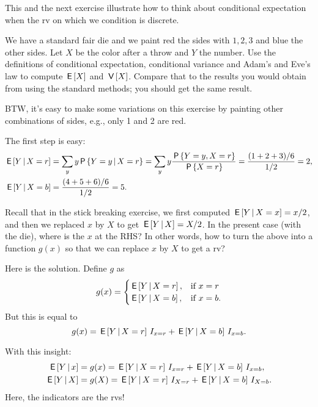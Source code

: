 This and the next exercise illustrate how to think about conditional expectation when the rv on which we condition is discrete.

\begin{exercise}
We have a standard fair die and we paint red the sides with $1, 2, 3$ and blue the other sides.
Let $X$ be the color after a throw and $Y$ the number.
Use the definitions of conditional expectation, conditional variance and Adam's and Eve's law to compute $\,\mathsf{E}\left[X\right]$ and $\,\mathsf{V}\left[X\right]$.
Compare that to the results you would obtain from using the standard methods; you should get the same result.

BTW, it's easy to make some variations on this exercise by painting other combinations of sides, e.g., only 1 and 2 are red.
\begin{solution}
The first step is easy:
\begin{align}
\,\mathsf{E}\left[Y\,\middle|\, X=r\right] &= \sum_{y} y \,\mathsf{P}\left\{Y=y\,\middle|\, X=r\right\} = \sum_{y} y \frac{\,\mathsf{P}\left\{Y=y,  X=r\right\}}{\,\mathsf{P}\left\{X=r\right\}} = \frac{(1+2+3)/6}{1/2}  = 2, \\
\,\mathsf{E}\left[Y\,\middle|\, X=b\right] &= \frac{(4 + 5+ 6)/6}{1/2}  = 5.
\end{align}

Recall that in the stick breaking exercise, we first computed $\,\mathsf{E}\left[Y\,\middle|\, X = x\right] = x/2$, and then we replaced $x$ by $X$ to get $\,\mathsf{E}\left[Y\,\middle|\, X\right] = X/2$. In the present case (with the die), where is the $x$ at the RHS? In other words, how to turn the above into a function $g(x)$ so that we can replace $x$ by $X$ to get a rv?


Here is the solution. Define $g$ as
\begin{equation}
  \label{eq:1}
  g(x) =
  \begin{cases}
    \,\mathsf{E}\left[Y\,\middle|\, X=r\right], & \text{if } x = r \\
    \,\mathsf{E}\left[Y\,\middle|\, X=b\right], & \text{if } x = b.
  \end{cases}
\end{equation}
But this is equal to
\begin{equation}
  \label{eq:2}
  g(x) = \,\mathsf{E}\left[Y\,\middle|\, X=r\right] \,I_{x=r} + \,\mathsf{E}\left[Y\,\middle|\, X=b\right] \,I_{x=b}.
\end{equation}

With this insight:
\begin{align*}
\,\mathsf{E}\left[Y\,\middle|\, x\right] &=  g(x) = \,\mathsf{E}\left[Y\,\middle|\, X=r\right] \,I_{x=r} + \,\mathsf{E}\left[Y\,\middle|\, X=b\right] \,I_{x=b}, \\
\,\mathsf{E}\left[Y\,\middle|\, X\right] &=  g(X) = \,\mathsf{E}\left[Y\,\middle|\, X=r\right] \,I_{X=r} + \,\mathsf{E}\left[Y\,\middle|\, X=b\right] \,I_{X=b}.
\end{align*}
Here, the indicators are the rvs!


\end{solution}
\end{exercise}
